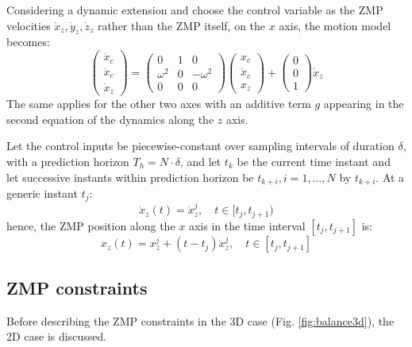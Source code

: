 Considering a dynamic extension and choose the control variable as the ZMP 
velocities $\dot{x}_z, \dot{y}_z, \dot{z}_z$ rather than the ZMP itself, on the 
$x$ axis, the motion model becomes:
\begin{equation}
  \label{eq:vhcomlip-motion-model}
  \begin{pmatrix}
    \dot{x}_c \\
    \ddot{x}_c \\
    \dot{x}_z
  \end{pmatrix}
  =
  \begin{pmatrix}
    0 & 1 & 0 \\
    \omega^2 & 0 & -\omega^2 \\
    0 & 0 & 0
  \end{pmatrix}
  \begin{pmatrix}
    x_c \\
    \dot{x}_c \\
    x_z
  \end{pmatrix}
  +
  \begin{pmatrix}
    0 \\
    0 \\
    1
  \end{pmatrix}
  \dot{x}_z
\end{equation}
The same applies for the other two axes with an additive term $g$ appearing 
in the second equation of the dynamics along the $z$ axis.

Let the control inputs be piecewise-constant over sampling intervals of
duration $\delta$, with a prediction horizon $T_h = N \cdot \delta$, and
let $t_k$ be the current time instant and let successive instants within
prediction horizon be $t_{k+i}, i = 1, \dots, N$ by $t_{k+i}$.
At a generic instant $t_j$:
\begin{equation}
  \dot{x}_z(t) = \dot{x}_z^j, \quad t \in [t_j, t_{j+1})
\end{equation}
hence, the ZMP position along the $x$ axis in the time interval
$[t_j, t_{j+1}]$ is:
\begin{equation}
  x_z(t) = x_z^j + (t - t_j) \dot{x}_z^j, \quad t \in [t_j, t_{j+1}]
\end{equation}

\subsection{ZMP constraints}
Before describing the ZMP constraints in the 3D case (Fig. \ref{fig:balance3d}),
the 2D case is discussed.

